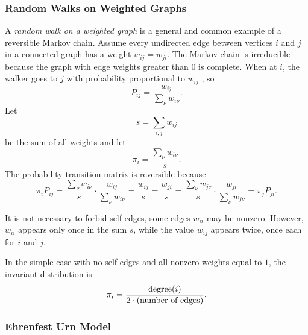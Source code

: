 \documentclass[12pt]{article}
\begin{document}
\subsubsection*{Random Walks on Weighted Graphs} A \emph{random walk on
a weighted graph}%
%
is a general and common example of a reversible Markov chain.  Assume
every undirected edge between vertices \( i \) and \( j \) in a
connected graph has a weight \( w_{ij} = w_{ji} \).  The Markov chain is
irreducible because the graph with edge weights greater than \( 0 \) is
complete.  When at \( i \), the walker goes to \( j \) with probability
proportional to \( w_{ij} \) , so
\[
    P_{ij} = \frac{w_{ij}}{\sum_{\nu} w_{i\nu}}.
\] Let
\[
    s = \sum_{i,j} w_{ij}
\] be the sum of all weights and let
\[
    \pi_i = \frac{\sum_{\nu} w_{i\nu}}{s}.
\] The probability transition matrix is reversible because
\[
    \pi_i P_{ij} = \frac{\sum_{\nu} w_{i\nu}}{s} \cdot \frac{w_{ij}}{\sum_
    {\nu} w_{i\nu}} = \frac{w_{ij}}{s} = \frac{w_{ji}}{s} = \frac{\sum_{\nu}
    w_{j\nu}}{s} \cdot \frac{w_{ji}}{\sum_{\nu} w_{j\nu}} = \pi_j P_{ji}.
\]

It is not necessary to forbid self-edges, some edges \( w_{ii} \) may be
nonzero.  However, \( w_{ii} \) appears only once in the sum \( s \),
while the value \( w_{ij} \) appears twice, once each for \( i \) and \(
j \).

In the simple case with no self-edges and all nonzero weights equal to \(
1 \), the invariant distribution is
\[
    \pi_i = \frac{%
    \operatorname{degree}
    (i)}{2 \cdot (\text{number of edges})}.
\]

\subsubsection*{Ehrenfest Urn Model}
\end{document}

